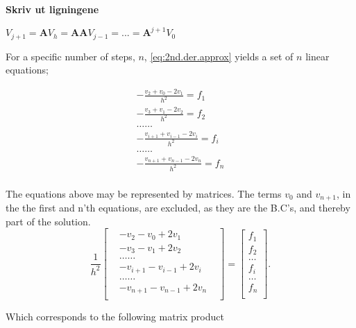 \documentclass[%
oneside,                 %
final,                   %
10pt]{article}
\begin{document}
\textbf{Skriv ut ligningene} \newline

$V_{j+1}=\mathbf{A}V_h=\mathbf{A}\mathbf{A}V_{j-1}=...=\mathbf{A}^{j+1}V_0$ \newline

For a specific number of steps, $n$, \eqref{eq:2nd.der.approx} yields a set of $n$ linear equations; \par 

\begin{align*}
   &-\frac{v_{2}+v_{0}-2v_1}{h^2} = f_1& \\
   &-\frac{v_{3}+v_{1}-2v_2}{h^2} = f_2 \\
   & \dots  \dots& \\
   & -\frac{v_{i+1}+v_{i-1}-2v_i}{h^2} = f_i& \\
   & \dots  \dots& \\
   & -\frac{v_{n+1}+v_{n-1}-2v_n}{h^2} = f_n& \\
\end{align*}

The equations above may be represented by matrices. The terms $v_0$ and $v_{n+1}$, in the the first and n'th equations, are excluded, as they are the B.C's, and thereby part of the solution. 
\[
    \frac{1}{h^2}\begin{bmatrix}
   &-v_{2}-v_{0}+2v_1 \\
   &-v_{3}-v_{1}+2v_2\\
   & \dots  \dots& \\
   & -v_{i+1}-v_{i-1}+2v_i \\
   & \dots  \dots& \\
   & -v_{n+1}-v_{n-1}+2v_n\\
                      \end{bmatrix}
  =\begin{bmatrix}
                           f_1\\
                           f_2\\
                           \dots \\
                           f_i \\
                          \dots \\
                           f_n\\
                      \end{bmatrix}.
\]

Which corresponds to the following matrix product
\end{document}
